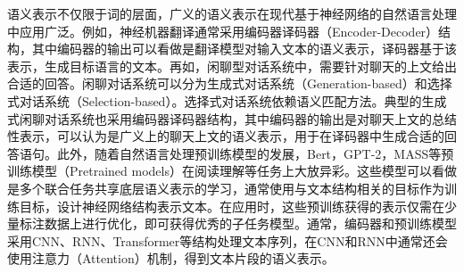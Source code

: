 语义表示不仅限于词的层面，广义的语义表示在现代基于神经网络的自然语言处理中应用广泛。例如，神经机器翻译通常采用编码器译码器（Encoder-Decoder）\cite{ sutskever2014sequence}结构，其中编码器的输出可以看做是翻译模型对输入文本的语义表示，译码器基于该表示，生成目标语言的文本。再如，闲聊型对话系统中，需要针对聊天的上文给出合适的回答。闲聊对话系统可以分为生成式对话系统（Generation-based）\cite{ shang2015neural}和选择式对话系统（Selection-based）\cite{ chen2017survey}。选择式对话系统依赖语义匹配方法。典型的生成式闲聊对话系统也采用编码器译码器结构，其中编码器的输出是对聊天上文的总结性表示，可以认为是广义上的聊天上文的语义表示，用于在译码器中生成合适的回答语句。此外，随着自然语言处理预训练模型的发展，Bert\cite{devlin2018bert}，GPT-2\cite{ radford2019language}，MASS\cite{ song2019mass}等预训练模型（Pretrained models）在阅读理解等任务上大放异彩。这些模型可以看做是多个联合任务共享底层语义表示的学习，通常使用与文本结构相关的目标作为训练目标，设计神经网络结构表示文本。在应用时，这些预训练获得的表示仅需在少量标注数据上进行优化，即可获得优秀的子任务模型。通常，编码器和预训练模型采用CNN、RNN、Transformer等结构处理文本序列，在CNN和RNN中通常还会使用注意力（Attention）机制，得到文本片段的语义表示。

